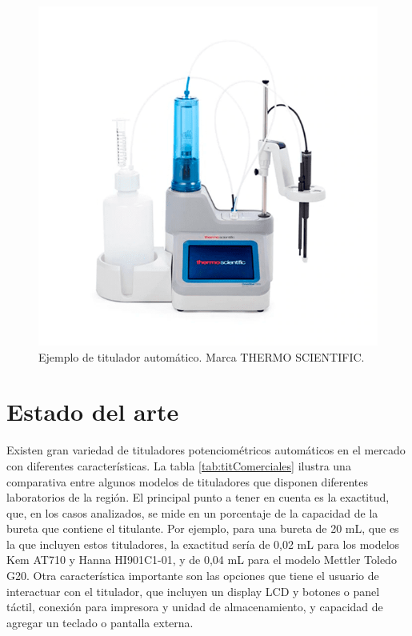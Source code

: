 \begin{figure}[htbp]
	\centering
	\includegraphics[width=.6\textwidth]{./Figures/titThermo.png}
	\caption{Ejemplo de titulador automático. Marca THERMO SCIENTIFIC\protect\footnotemark.}
	\label{fig:titThermo}
\end{figure}

\section{Estado del arte}


Existen gran variedad de tituladores potenciométricos automáticos en el mercado con diferentes características. La tabla \ref{tab:titComerciales} ilustra una comparativa entre algunos modelos de tituladores que disponen diferentes laboratorios de la región. El principal punto a tener en cuenta es la exactitud, que, en los casos analizados, se mide en un porcentaje de la capacidad de la bureta que contiene el titulante. Por ejemplo, para una bureta de 20 mL, que es la que incluyen estos tituladores, la exactitud sería de 0,02 mL para los modelos Kem AT710 y Hanna HI901C1-01, y de 0,04 mL para el modelo Mettler Toledo G20. Otra característica importante son las opciones que tiene el usuario de interactuar con el titulador, que incluyen un display LCD y botones o panel táctil, conexión para impresora y unidad de almacenamiento, y capacidad de agregar un teclado o pantalla externa.


